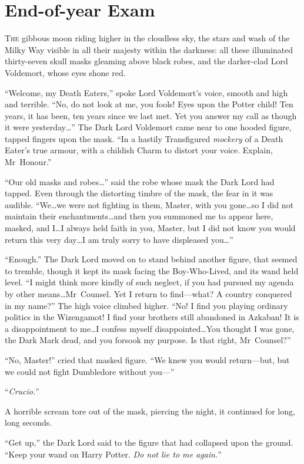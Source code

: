 \chapter{End-of-year Exam}

\lettrine{T}{he} gibbous moon riding higher in the cloudless sky, the stars and wash of the Milky Way visible in all their majesty within the darkness: all these illuminated thirty-seven skull masks gleaming above black robes, and the darker-clad Lord Voldemort, whose eyes shone red.

“Welcome, my Death Eaters,” spoke Lord Voldemort’s voice, smooth and high and terrible. “No, do not look at me, you fools! Eyes upon the Potter child! Ten years, it has been, ten years since we last met. Yet you answer my call as though it were yesterday…” The Dark Lord Voldemort came near to one hooded figure, tapped fingers upon the mask. “In a hastily Transfigured \emph{mockery} of a Death Eater’s true armour, with a childish Charm to distort your voice. Explain, Mr~Honour.”

“Our old masks and robes…” said the robe whose mask the Dark Lord had tapped. Even through the distorting timbre of the mask, the fear in it was audible. “We…we were not fighting in them, Master, with you gone…so I did not maintain their enchantments…and then you summoned me to appear here, masked, and I…I always held faith in you, Master, but I did not know you would return this very day…I am truly sorry to have displeased you…”

“Enough.” The Dark Lord moved on to stand behind another figure, that seemed to tremble, though it kept its mask facing the Boy-Who-Lived, and its wand held level. “I might think more kindly of such neglect, if you had pursued my agenda by other means…Mr~Counsel. Yet I return to find—what? A country conquered in my name?” The high voice climbed higher. “No! I find you playing ordinary politics in the Wizengamot! I find your brothers still abandoned in Azkaban! It is a disappointment to me…I confess myself disappointed…You thought I was gone, the Dark Mark dead, and you forsook my purpose. Is that right, Mr~Counsel?”

“No, Master!” cried that masked figure. “We knew you would return—but, but we could not fight Dumbledore without you—”

“\emph{Crucio.}”

A horrible scream tore out of the mask, piercing the night, it continued for long, long seconds.

“Get up,” the Dark Lord said to the figure that had collapsed upon the ground. “Keep your wand on Harry Potter. \emph{Do not lie to me again.}”

